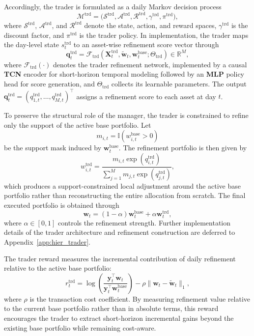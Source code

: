 \documentclass[letterpaper]{article} %
\begin{document}
Accordingly, the trader is formulated as a daily Markov decision process
\[
\mathcal{M}^{\mathrm{trd}}
=
\bigl(
\mathcal{S}^{\mathrm{trd}},
\mathcal{A}^{\mathrm{trd}},
\mathcal{R}^{\mathrm{trd}},
\gamma^{\mathrm{trd}},
\pi^{\mathrm{trd}}
\bigr),
\]
where \(\mathcal{S}^{\mathrm{trd}}\), \(\mathcal{A}^{\mathrm{trd}}\), and \(\mathcal{R}^{\mathrm{trd}}\) denote the state, action, and reward spaces, \(\gamma^{\mathrm{trd}}\) is the discount factor, and \(\pi^{\mathrm{trd}}\) is the trader policy. In implementation, the trader maps the day-level state \(s_t^{\mathrm{trd}}\) to an asset-wise refinement score vector through
\[
\mathbf{q}_t^{\mathrm{trd}}
=
\mathcal{F}_{\mathrm{trd}}
\!\left(
\mathbf{X}_t^{\mathrm{trd}},\tilde{\mathbf{w}}_t,\mathbf{w}_t^{\mathrm{base}};
\Theta_{\mathrm{trd}}
\right)
\in\mathbb{R}^{M},
\]
where \(\mathcal{F}_{\mathrm{trd}}(\cdot)\) denotes the trader refinement network, implemented by a causal \textbf{TCN} \citep{TCN} encoder for short-horizon temporal modeling followed by an \textbf{MLP} policy head for score generation, and \(\Theta_{\mathrm{trd}}\) collects its learnable parameters. The output \(\mathbf{q}_t^{\mathrm{trd}}=(q_{1,t}^{\mathrm{trd}},\dots,q_{M,t}^{\mathrm{trd}})^\top\) assigns a refinement score to each asset at day \(t\).

To preserve the structural role of the manager, the trader is constrained to refine only the support of the active base portfolio. Let
\[
m_{i,t}
=
\mathbb{I}\!\left(w_{i,t}^{\mathrm{base}}>0\right)
\]
be the support mask induced by \(\mathbf{w}_t^{\mathrm{base}}\). The refinement portfolio is then given by
\[
w_{i,t}^{\mathrm{trd}}
=
\frac{
m_{i,t}\exp(q_{i,t}^{\mathrm{trd}})
}{
\sum_{j=1}^{M} m_{j,t}\exp(q_{j,t}^{\mathrm{trd}})
},
\]
which produces a support-constrained local adjustment around the active base portfolio rather than reconstructing the entire allocation from scratch. The final executed portfolio is obtained through
\[
\mathbf{w}_t
=
(1-\alpha)\mathbf{w}_t^{\mathrm{base}}
+
\alpha\mathbf{w}_t^{\mathrm{trd}},
\]
where \(\alpha\in[0,1]\) controls the refinement strength. Further implementation details of the trader architecture and refinement construction are deferred to Appendix~\ref{app:hier_trader}.

The trader reward measures the incremental contribution of daily refinement relative to the active base portfolio:
\[
r_t^{\mathrm{trd}}
=
\log\!\left(
\frac{\mathbf{y}_t^\top \mathbf{w}_t}
{\mathbf{y}_t^\top \mathbf{w}_t^{\mathrm{base}}}
\right)
-
\rho \|\mathbf{w}_t-\tilde{\mathbf{w}}_t\|_1,
\]
where \(\rho\) is the transaction cost coefficient. By measuring refinement value relative to the current base portfolio rather than in absolute terms, this reward encourages the trader to extract short-horizon incremental gains beyond the existing base portfolio while remaining cost-aware.
\end{document}
